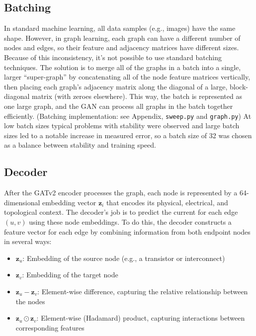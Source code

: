 \documentclass[10pt,twocolumn,letterpaper]{article}
\begin{document}
\subsection{Batching}
\label{subsec:batching}

In standard machine learning, all data samples (e.g., images) have the same shape.  However, in graph learning, each graph can have a different number of nodes and edges, so their feature and adjacency matrices have different sizes. Because of this inconsistency, it's not possible to use standard batching techniques. The solution is to merge all of the graphs in a batch into a single, larger ``super-graph'' by concatenating all of the node feature matrices vertically, then placing each graph's adjacency matrix along the diagonal of a large, block-diagonal matrix (with zeroes elsewhere). This way, the batch is represented as one large graph, and the GAN can process all graphs in the batch together efficiently. \cite{PyG_Documentation} (Batching implementation: see Appendix, \texttt{sweep.py} and \texttt{graph.py})
At low batch sizes typical problems with stability were observed and large batch sizes led to a notable increase in measured error, so a batch size of 32 was chosen as a balance between stability and training speed.

\subsection{Decoder}
\label{subsec:decoder}

After the GATv2 encoder processes the graph, each node is represented by a 64-dimensional embedding vector $\mathbf{z}_i$ that encodes its physical, electrical, and topological context. The decoder's job is to predict the current for each edge $(u, v)$ using these node embeddings.  To do this, the decoder constructs a feature vector for each edge by combining information from both endpoint nodes in several ways:

\begin{itemize}
  \item $\mathbf{z}_u$: Embedding of the source node (e.g., a transistor or interconnect)
  \item $\mathbf{z}_v$: Embedding of the target node
  \item $\mathbf{z}_u - \mathbf{z}_v$: Element-wise difference, capturing the relative relationship between the nodes
  \item $\mathbf{z}_u \odot \mathbf{z}_v$: Element-wise (Hadamard) product, capturing interactions between corresponding features
\end{itemize}
\end{document}
